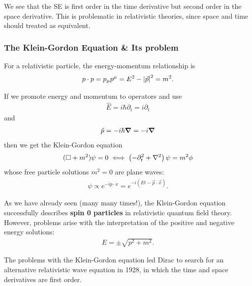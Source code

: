 \documentclass{book}
\theoremstyle{definition}
\newcommand{\p}{\partial}
\newcommand{\lp}{\left(}
\newcommand{\rp}{\right)}
\begin{document}
We see that the SE is first order in the time derivative but second order in the space derivative. This is problematic in relativistic theories, since space and time should treated as equivalent. 






\subsubsection{The Klein-Gordon Equation \& Its problem}



For a relativistic particle, the energy-momentum relationship is
\begin{align}
p\cdot p = p_\mu p^\mu = E^2 - \abs{\vec{p}}^2 = m^2.
\end{align}

If we promote energy and momentum to operators and use
\begin{align}
\hat{E} = i\hbar \p_t = i\p_t
\end{align}
and
\begin{align}
\hat{p} = -i\hbar \grad = -i\grad
\end{align}
then we get the Klein-Gordon equation
\begin{align}
(\square + m^2)\psi = 0 \iff \lp -\p_t^2 + \laplacian \rp\psi = m^2 \phi
\end{align}
whose free particle solutions $m^2 = 0 $ are plane waves:
\begin{align}
\psi \propto e^{-ip\cdot x} = e^{-i(Et - \vec{p}\cdot\vec{x})}.
\end{align}

As we have already seen (many many times!), the Klein-Gordon equation successfully describes \textbf{spin 0 particles} in relativistic quantum field theory. However, problems arise with the interpretation of the positive and negative energy solutions:
\begin{align}
E = \pm \sqrt{p^2 + m^2}.
\end{align}


The problems with the Klein-Gordon equation led Dirac to search for an alternative
relativistic wave equation in 1928, in which the time and space derivatives are first
order.
\end{document}
